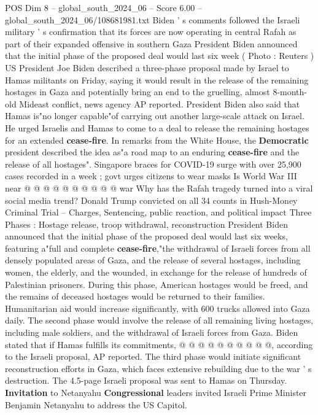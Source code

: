 \begin{textsample}{POS Dim 8 – global\_south\_2024\_06 – Score 6.00 – global\_south\_2024\_06/108681981.txt}  \label{ex:f8_pos_211}
Biden ' s comments followed the Israeli military ' s confirmation that its forces are now operating in central Rafah as part of their expanded offensive in southern Gaza President Biden announced that the initial phase of the proposed deal would last six week ( Photo : Reuters ) US President Joe Biden described a three-phase proposal made by Israel to Hamas militants on Friday, saying it would result in the release of the remaining hostages in Gaza and potentially bring an end to the gruelling, almost 8-month-old Mideast conflict, news agency AP reported.
President Biden also said that Hamas is"no longer capable"of carrying out another large-scale attack on Israel.
He urged Israelis and Hamas to come to a deal to release the remaining hostages for an extended \textbf{cease-fire}.
In remarks from the White House, the \textbf{Democratic} president described the idea as"a road map to an enduring \textbf{cease-fire} and the release of all hostages".
Singapore braces for COVID-19 surge with over 25,900 cases recorded in a week ; govt urges citizens to wear masks Is World War III near @ @ @ @ @ @ @ @ @ @ war Why has the Rafah tragedy turned into a viral social media trend?
Donald Trump convicted on all 34 counts in Hush-Money Criminal Trial -- Charges, Sentencing, public reaction, and political impact Three Phases : Hostage release, troop withdrawal, reconstruction President Biden announced that the initial phase of the proposed deal would last six weeks, featuring a"full and complete \textbf{cease-fire},"the withdrawal of Israeli forces from all densely populated areas of Gaza, and the release of several hostages, including women, the elderly, and the wounded, in exchange for the release of hundreds of Palestinian prisoners.
During this phase, American hostages would be freed, and the remains of deceased hostages would be returned to their families.
Humanitarian aid would increase significantly, with 600 trucks allowed into Gaza daily.
The second phase would involve the release of all remaining living hostages, including male soldiers, and the withdrawal of Israeli forces from Gaza.
Biden stated that if Hamas fulfills its commitments, @ @ @ @ @ @ @ @ @ @, according to the Israeli proposal, AP reported.
The third phase would initiate significant reconstruction efforts in Gaza, which faces extensive rebuilding due to the war ' s destruction.
The 4.5-page Israeli proposal was sent to Hamas on Thursday. \textbf{Invitation} to Netanyahu \textbf{Congressional} leaders invited Israeli Prime Minister Benjamin Netanyahu to address the US Capitol.

\end{textsample}
